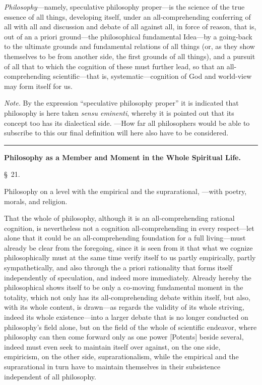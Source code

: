 \documentclass[12pt,a4paper]{book}
\newcommand{\grouphead}[1]{%
  \bigskip\begin{center}\large\textbf{#1}\end{center}\smallskip}
\begin{document}
\emph{Philosophy}---namely, speculative philosophy proper---is the science of the
true essence of all things, developing itself, under an all-comprehending conferring
of all with all and discussion and debate of all against all, in force of reason,
that is, out of an a priori ground---the philosophical fundamental Idea---by a
going-back to the ultimate grounds and fundamental relations of all things (or, as
they show themselves to be from another side, the first grounds of all things), and a
pursuit of all that to which the cognition of these must further lead, so that an
all-comprehending scientific---that is, systematic---cognition of God and world-view
may form itself for us.

{\small\emph{Note.} By the expression ``speculative philosophy proper'' it is
indicated that philosophy is here taken \textit{sensu eminenti}, whereby it is
pointed out that its concept too has its dialectical side. ---How far all philosophers
would be able to subscribe to this our final definition will here also have to be
considered.\par}

\begin{center}\rule{0.18\linewidth}{0.4pt}\end{center}

\grouphead{Philosophy as a Member and Moment in the Whole Spiritual Life.}

\begin{center}\large\S~21.\end{center}
\begin{center}Philosophy on a level with the empirical and the suprarational,
---with poetry, morals, and religion.\end{center}

That the whole of philosophy, although it is an all-comprehending rational cognition,
is nevertheless not a cognition all-comprehending in every respect---let alone that it
could be an all-comprehending foundation for a full living---must already be clear from
the foregoing, since it is seen from it that what we cognize philosophically must at
the same time verify itself to us partly empirically, partly sympathetically, and also
through the a priori rationality that forms itself independently of speculation, and
indeed more immediately. Already hereby the philosophical shows itself to be only a
co-moving fundamental moment in the totality, which not only has its all-comprehending
debate within itself, but also, with its whole content, is drawn---as regards the
validity of its whole striving, indeed its whole existence---into a larger debate that
is no longer conducted on philosophy's field alone, but on the field of the whole of
scientific endeavor, where philosophy can then come forward only as one power
[Potents] beside several, indeed must even seek to maintain itself over against, on the
one side, empiricism, on the other side, suprarationalism, while the empirical and the
suprarational in turn have to maintain themselves in their subsistence independent of
all philosophy.
\end{document}
